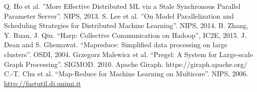 \documentclass[conference]{IEEEtran}
\begin{document}
\begin{thebibliography}{99}
Q. Ho et al. ''More Effective Distributed ML via a Stale Synchronous Parallel Parameter Server''. NIPS, 2013.
S. Lee et al. ''On Model Parallelization and Scheduling Strategies for Distributed Machine Learning''. NIPS, 2014.
B. Zhang, Y. Ruan, J. Qiu. “Harp: Collective Communication on Hadoop”, IC2E, 2015.
J. Dean and S. Ghemawat. ``Mapreduce: Simplified data processing on large clusters''. OSDI, 2004.
Grzegorz Malewicz et al. ``Pregel: A System for Large-scale Graph Processing''. SIGMOD. 2010.
Apache Giraph. https://giraph.apache.org/
C.-T. Chu et al. ``Map-Reduce for Machine Learning on Multicore''. NIPS, 2006.
\url{http://fastutil.di.unimi.it}
\end{thebibliography}




\end{document}

